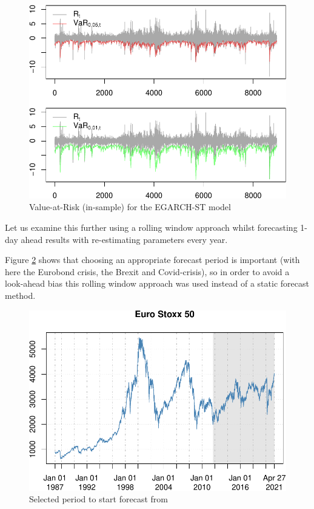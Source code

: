 \documentclass[a4paper, nobind]{templates/ociamthesis}
\begin{document}
\begin{figure}[h]

{\centering \includegraphics[width=0.6\linewidth]{_main_files/figure-latex/figVaRinsample-1} 

}

\caption{Value-at-Risk (in-sample) for the EGARCH-ST model}\label{fig:figVaRinsample}
\end{figure}

\noindent Let us examine this further using a rolling window approach whilst forecasting 1-day ahead results with re-estimating parameters every year.

\noindent Figure \ref{fig:figbacktest} shows that choosing an appropriate forecast period is important (with here the Eurobond crisis, the Brexit and Covid-crisis), so in order to avoid a look-ahead bias this rolling window approach was used instead of a static forecast method. \newpage

\begin{figure}[h]

{\centering \includegraphics[width=0.7\linewidth]{_main_files/figure-latex/figbacktest-1} 

}

\caption{Selected period to start forecast from}\label{fig:figbacktest}
\end{figure}
\end{document}
